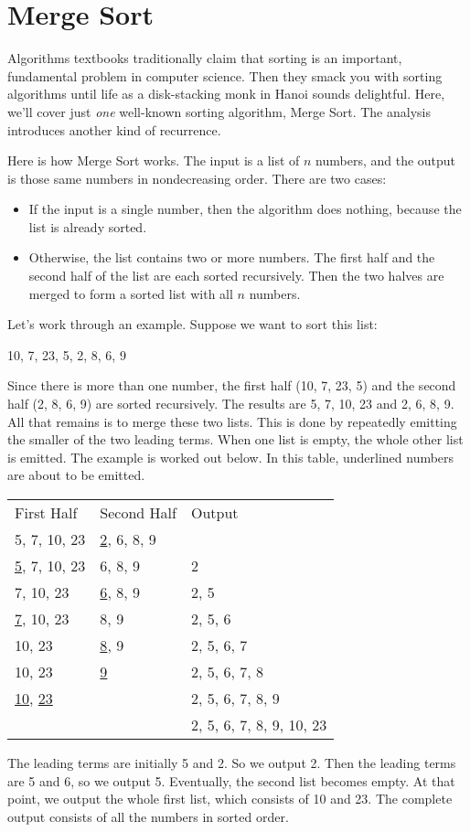 \section{Merge Sort}

Algorithms textbooks traditionally claim that sorting is an important,
fundamental problem in computer science.  Then they smack you with
sorting algorithms until life as a disk-stacking monk in Hanoi sounds
delightful.  Here, we'll cover just \emph{one} well-known sorting
algorithm, Merge Sort.  The analysis introduces another kind of
recurrence.

Here is how Merge Sort works.  The input is a list of $n$ numbers, and
the output is those same numbers in nondecreasing order.  There are
two cases:
\begin{itemize}
\item If the input is a single number, then the algorithm does nothing,
  because the list is already sorted.
\item Otherwise, the list contains two or more numbers.  The first
  half and the second half of the list are each sorted recursively.
  Then the two halves are merged to form a sorted list with all $n$
  numbers.
\end{itemize}

Let's work through an example.  Suppose we want to sort this list:
\begin{center}
10, 7, 23, 5, 2, 8, 6, 9
\end{center}
Since there is more than one number, the first half (10, 7, 23, 5) and
the second half (2, 8, 6, 9) are sorted recursively.  The results are
5, 7, 10, 23 and 2, 6, 8, 9.  All that remains is to merge these two
lists.  This is done by repeatedly emitting the smaller of the two
leading terms.  When one list is empty, the whole other list is
emitted.  The example is worked out below.   In this table, underlined
numbers are about to be emitted.
\begin{center}
\begin{tabular}{lll}
First Half & Second Half & Output \\
5, 7, 10, 23 & \underline{2}, 6, 8, 9 & \\
\underline{5}, 7, 10, 23 & 6, 8, 9 & 2\\
7, 10, 23 & \underline{6}, 8, 9 & 2, 5 \\
\underline{7}, 10, 23 & 8, 9 & 2, 5, 6 \\
10, 23 & \underline{8}, 9 & 2, 5, 6, 7 \\
10, 23 & \underline{9} & 2, 5, 6, 7, 8 \\
\underline{10}, \underline{23} & & 2, 5, 6, 7, 8, 9 \\
& & 2, 5, 6, 7, 8, 9, 10, 23
\end{tabular}
\end{center}
The leading terms are initially 5 and 2.  So we output 2.  Then the
leading terms are 5 and 6, so we output 5.  Eventually, the second
list becomes empty.  At that point, we output the whole first list,
which consists of 10 and 23.  The complete output consists of all the
numbers in sorted order.

